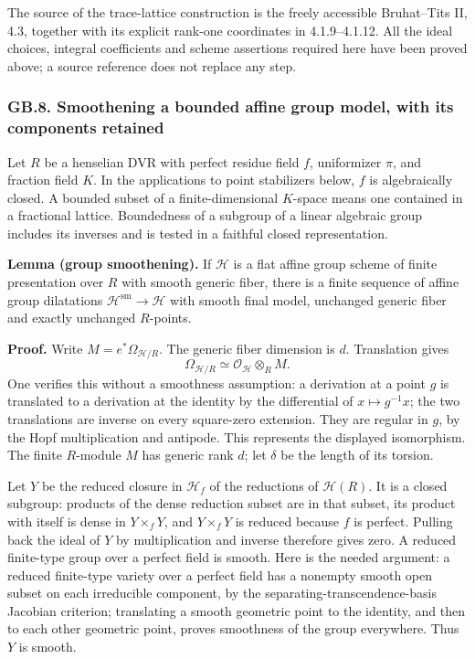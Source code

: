 \documentclass[
  11pt,
]{article}
\begin{document}
The source of the trace-lattice construction is the freely accessible
Bruhat--Tits II, 4.3, together with its explicit rank-one coordinates in
4.1.9--4.1.12. All the ideal choices, integral coefficients and scheme
assertions required here have been proved above; a source reference does
not replace any step.

\subsubsection{GB.8. Smoothening a bounded affine group model, with its
components
retained}\label{gb.8.-smoothening-a-bounded-affine-group-model-with-its-components-retained}

Let \(R\) be a henselian DVR with perfect residue field \(f\),
uniformizer \(\pi\), and fraction field \(K\). In the applications to
point stabilizers below, \(f\) is algebraically closed. A bounded subset
of a finite-dimensional \(K\)-space means one contained in a fractional
lattice. Boundedness of a subgroup of a linear algebraic group includes
its inverses and is tested in a faithful closed representation.

\textbf{Lemma (group smoothening).} If \(\mathcal H\) is a flat affine
group scheme of finite presentation over \(R\) with smooth generic
fiber, there is a finite sequence of affine group dilatations
\(\mathcal H^{\mathrm{sm}}\longrightarrow\mathcal H\) with smooth final
model, unchanged generic fiber and exactly unchanged \(R\)-points.

\textbf{Proof.} Write \(M=e^*\Omega_{\mathcal H/R}\). The generic fiber
dimension is \(d\). Translation gives \[
 \Omega_{\mathcal H/R}\simeq\mathcal O_{\mathcal H}\otimes_R M.
 \tag{GB.27}
\] One verifies this without a smoothness assumption: a derivation at a
point \(g\) is translated to a derivation at the identity by the
differential of \(x\mapsto g^{-1}x\); the two translations are inverse
on every square-zero extension. They are regular in \(g\), by the Hopf
multiplication and antipode. This represents the displayed isomorphism.
The finite \(R\)-module \(M\) has generic rank \(d\); let \(\delta\) be
the length of its torsion.

Let \(Y\) be the reduced closure in \(\mathcal H_f\) of the reductions
of \(\mathcal H(R)\). It is a closed subgroup: products of the dense
reduction subset are in that subset, its product with itself is dense in
\(Y\times_fY\), and \(Y\times_fY\) is reduced because \(f\) is perfect.
Pulling back the ideal of \(Y\) by multiplication and inverse therefore
gives zero. A reduced finite-type group over a perfect field is smooth.
Here is the needed argument: a reduced finite-type variety over a
perfect field has a nonempty smooth open subset on each irreducible
component, by the separating-transcendence-basis Jacobian criterion;
translating a smooth geometric point to the identity, and then to each
other geometric point, proves smoothness of the group everywhere. Thus
\(Y\) is smooth.
\end{document}
